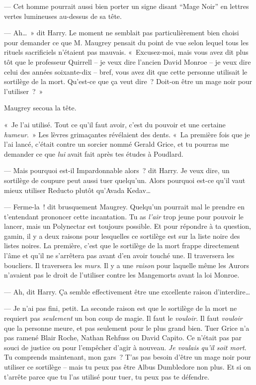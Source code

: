 --- Cet homme pourrait aussi bien porter un signe disant “Mage Noir” en lettres vertes lumineuses au-dessus de sa tête.

--- Ah…~» dit Harry.
Le moment ne semblait pas particulièrement bien choisi pour demander ce que M. Maugrey pensait du point de vue selon lequel tous les rituels sacrificiels n'étaient pas mauvais.
«~Excusez-moi, mais vous avez dit plus tôt que le professeur Quirrell -- je veux dire l'ancien David Monroe -- je veux dire celui des années soixante-dix -- bref, vous avez dit que cette personne utilisait le sortilège de la mort.
Qu'est-ce que ça veut dire~?
Doit-on être un mage noir pour l'utiliser~?~»

Maugrey secoua la tête.

«~Je l'ai utilisé.
Tout ce qu'il faut avoir, c'est du pouvoir et une certaine \emph{humeur}.~»
Les lèvres grimaçantes révélaient des dents.
«~La première fois que je l'ai lancé, c'était contre un sorcier nommé Gerald Grice, et tu pourras me demander ce que \emph{lui} avait fait après tes études à Poudlard.

--- Mais pourquoi est-il Impardonnable alors~? dit Harry.
Je veux dire, un sortilège de coupure peut aussi tuer quelqu'un.
Alors pourquoi est-ce qu'il vaut mieux utiliser Reducto plutôt qu'Avada Kedav…

--- Ferme-la~! dit brusquement Maugrey.
Quelqu'un pourrait mal le prendre en t'entendant prononcer cette incantation.
Tu as \emph{l'air} trop jeune pour pouvoir le lancer, mais un Polynectar est toujours possible.
Et pour répondre à ta question, gamin, il y a deux raisons pour lesquelles ce sortilège est sur la liste noire des listes noires.
La première, c'est que le sortilège de la mort frappe directement l'âme et qu'il ne s'arrêtera pas avant d'en avoir touché une.
Il traversera les boucliers.
Il traversera les \emph{murs}.
Il y a une \emph{raison} pour laquelle même les Aurors n'avaient pas le droit de l'utiliser contre les Mangemorts avant la loi Monroe.

--- Ah, dit Harry.
Ça semble effectivement être une excellente raison d'interdire…

--- Je n'ai pas fini, petit.
La seconde raison est que le sortilège de la mort ne requiert pas \emph{seulement} un bon coup de magie.
Il faut le \emph{vouloir}.
Il faut \emph{vouloir} que la personne meure, et pas seulement pour le plus grand bien.
Tuer Grice n'a pas ramené Blair Roche, Nathan Rehfuss ou David Capito.
Ce n'était pas par souci de justice ou pour l'empêcher d'agir à nouveau.
\emph{Je voulais qu'il soit mort}.
Tu comprends maintenant, mon gars~?
T'as pas besoin d'être un mage noir pour utiliser ce sortilège -- mais tu peux pas être Albus Dumbledore non plus.
Et si on t'arrête parce que tu l'as utilisé pour tuer, tu peux pas te défendre.

